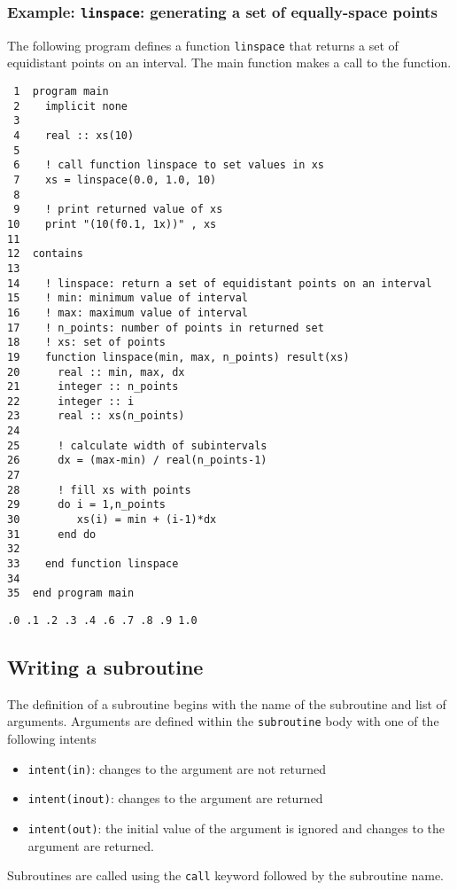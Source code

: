 \documentclass[11pt]{article}
\begin{document}
\subsubsection{Example: \texttt{linspace}: generating a set of equally-space points}
\label{sec:orgheadline41}
The following program defines a function \texttt{linspace} that returns a set of equidistant points on an interval. The main function makes a call to the function.
\begin{verbatim}
 1  program main
 2    implicit none
 3  
 4    real :: xs(10)
 5  
 6    ! call function linspace to set values in xs
 7    xs = linspace(0.0, 1.0, 10)
 8  
 9    ! print returned value of xs
10    print "(10(f0.1, 1x))" , xs
11  
12  contains
13  
14    ! linspace: return a set of equidistant points on an interval
15    ! min: minimum value of interval
16    ! max: maximum value of interval
17    ! n_points: number of points in returned set
18    ! xs: set of points
19    function linspace(min, max, n_points) result(xs)
20      real :: min, max, dx
21      integer :: n_points
22      integer :: i
23      real :: xs(n_points)
24  
25      ! calculate width of subintervals
26      dx = (max-min) / real(n_points-1)
27  
28      ! fill xs with points
29      do i = 1,n_points
30         xs(i) = min + (i-1)*dx
31      end do
32  
33    end function linspace
34  
35  end program main
\end{verbatim}

\begin{verbatim}
.0 .1 .2 .3 .4 .6 .7 .8 .9 1.0
\end{verbatim}

\subsection{Writing a subroutine}
\label{sec:orgheadline44}
The definition of a subroutine begins with the name of the subroutine and list of arguments. Arguments are defined within the \texttt{subroutine} body with one of the following intents
\begin{itemize}
\item \texttt{intent(in)}: changes to the argument are not returned
\item \texttt{intent(inout)}: changes to the argument are returned
\item \texttt{intent(out)}: the initial value of the argument is ignored and changes to the argument are returned.
\end{itemize}
Subroutines are called using the \texttt{call} keyword followed by the subroutine name.
\end{document}
